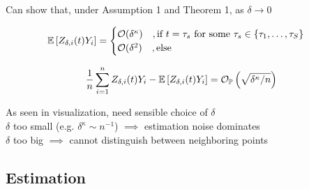 \begin{frame}
    \vspace{-0.5cm}

    Can show that, under Assumption 1 and Theorem 1, as $\delta \to 0$

    \vspace{0.5cm}

    \[
    \mathbb{E}\left[Z_{\delta, i}(t) Y_i\right] = 
        \begin{cases}
            \mathcal{O}(\delta^\kappa) \quad, \text{if } t = \tau_s
            \text{ for some } \tau_s \in \{\tau_1, \dots, \tau_S\}\\
            \mathcal{O}(\delta^2) \quad, \text{else}
        \end{cases}
    \]

    \vspace{0.5cm}

    \[
    \frac{1}{n} \sum_{i = 1}^n Z_{\delta, i}(t) Y_i - \mathbb{E}\left[Z_{\delta, i}(t) Y_i\right]
    = \mathcal{O}_{\mathbb{P}} \left( \sqrt{\delta^{\kappa} / n} \right)
    \]

    \vspace{0.5cm}

    As seen in visualization, need sensible choice of $\delta$\\[1em]
     $\delta$ too small (e.g. $\delta^\kappa \sim n^{-1}$) $\implies$
        estimation noise dominates\\
     $\delta$ too big $\implies$ cannot distinguish between neighboring points


\end{frame}


\subsection{Estimation}


